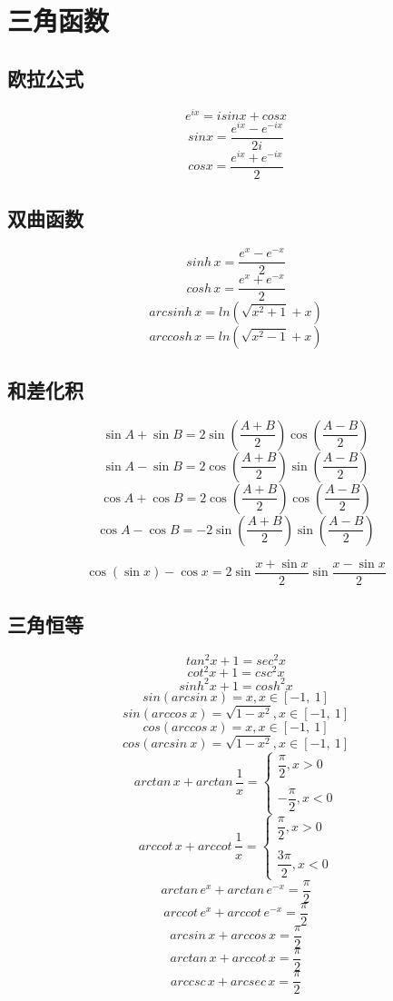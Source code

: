 
\section{三角函数}

\subsection{欧拉公式}
\[e^{ix} = isinx + cosx\]
\[sinx = \dfrac{e^{ix} - e^{-ix}}{2i}\]
\[cosx = \dfrac{e^{ix} + e^{-ix}}{2}\]

\subsection{双曲函数}
\[sinh\,x = \dfrac{e^{x} - e^{-x}}{2}\]
\[cosh\,x = \dfrac{e^{x} + e^{-x}}{2}\]
\[arcsinh\,x = ln(\sqrt{x^{2} + 1} + x)\]
\[arccosh\,x = ln(\sqrt{x^{2} - 1} + x)\]


\subsection{和差化积}

\[\sin A+\sin B = 2\sin\left(\frac{A + B}{2}\right)\cos\left(\frac{A - B}{2}\right)\]
\[\sin A-\sin B = 2\cos\left(\frac{A + B}{2}\right)\sin\left(\frac{A - B}{2}\right)\]
\[\cos A + \cos B = 2\cos\left(\frac{A + B}{2}\right)\cos\left(\frac{A - B}{2}\right)\]
\[\cos A - \cos B = -2\sin\left(\frac{A + B}{2}\right)\sin\left(\frac{A - B}{2}\right)\]

\[\cos(\sin x) - \cos x = 2\sin\dfrac{x + \sin x}{2}\sin\dfrac{x - \sin x}{2}\]


\subsection{三角恒等}
\[tan^{2}x + 1 = sec^{2}x\]
\[cot^{2}x + 1 = csc^{2}x\]
\[sinh^{2}x + 1 = cosh^{2}x\]
\[sin(arcsin\ x) = x, x \in [-1,\ 1]\]
\[sin(arccos\ x) = \sqrt{1 - x^2}, x \in [-1,\ 1]\]
\[cos(arccos\ x) = x, x \in [-1,\ 1]\]
\[cos(arcsin\ x) = \sqrt{1 - x^2}, x \in [-1,\ 1]\]
\[arctan\,x + arctan\,\frac{1}{x} = 
\begin{cases}
\dfrac{\pi}{2},x > 0 \\ \\
-\dfrac{\pi}{2}, x < 0
\end{cases}\]
\[arccot\,x + arccot\,\frac{1}{x} = 
\begin{cases}
\dfrac{\pi}{2},x > 0 \\ \\
\dfrac{3\pi}{2}, x < 0
\end{cases}\]
\[arctan\,e^{x} + arctan\,e^{-x} = \dfrac{\pi}{2}\]
\[arccot\,e^{x} + arccot\,e^{-x} = \dfrac{\pi}{2}\]
\[arcsin\,x + arccos\,x = \dfrac{\pi}{2}\]
\[arctan\,x + arccot\,x = \dfrac{\pi}{2}\]
\[arccsc\,x + arcsec\,x = \dfrac{\pi}{2}\]

